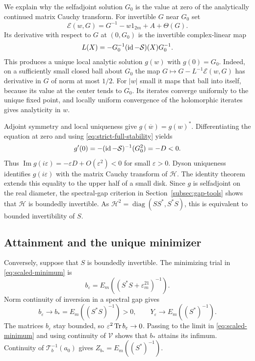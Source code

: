 We explain why the selfadjoint solution $G_0$ is the value at zero of the analytically continued matrix Cauchy transform.
For invertible $G$ near $G_0$ set
\[
 \mathcal E(w,G)=G^{-1}-w1_{2m}+A+\Theta(G).
\]
Its derivative with respect to $G$ at $(0,G_0)$ is the invertible complex-linear map
\[
 L(X)=-G_0^{-1}(\operatorname{id}-\mathcal S)(X)G_0^{-1}.
\]
This produces a unique local analytic solution $g(w)$ with $g(0)=G_0$.
Indeed, on a sufficiently small closed ball about $G_0$ the map $G\mapsto G-L^{-1}\mathcal E(w,G)$ has derivative in $G$ of norm at most $1/2$.
For $|w|$ small it maps that ball into itself, because its value at the center tends to $G_0$.
Its iterates converge uniformly to the unique fixed point, and locally uniform convergence of the holomorphic iterates gives analyticity in $w$.

Adjoint symmetry and local uniqueness give $g(\overline w)=g(w)^*$.
Differentiating the equation at zero and using \eqref{eq:strict-full-stability} yields
\begin{equation}\label{eq:gap-derivative}
 g'(0)=-(\operatorname{id}-\mathcal S)^{-1}(G_0^2)=-D<0.
\end{equation}
Thus $\operatorname{Im}g(i\varepsilon)=-\varepsilon D+O(\varepsilon^2)<0$ for small $\varepsilon>0$.
Dyson uniqueness identifies $g(i\varepsilon)$ with the matrix Cauchy transform of $\mathscr H$.
The identity theorem extends this equality to the upper half of a small disk.
Since $g$ is selfadjoint on the real diameter, the spectral-gap criterion in Section~\ref{subsec:gap-tools} shows that $\mathscr H$ is boundedly invertible.
As $\mathscr H^2=\operatorname{diag}(SS^*,S^*S)$, this is equivalent to bounded invertibility of $S$.

\subsection{Attainment and the unique minimizer}
Conversely, suppose that $S$ is boundedly invertible.
The minimizing trial in \eqref{eq:scaled-minimum} is
\[
 b_\varepsilon=E_m((S^*S+\varepsilon^21_m)^{-1}).
\]
Norm continuity of inversion in a spectral gap gives
\[
 b_\varepsilon\longrightarrow b_*=E_m((S^*S)^{-1})>0,
 \qquad Y_\varepsilon\longrightarrow E_m((S^*)^{-1}).
\]
The matrices $b_\varepsilon$ stay bounded, so $\varepsilon^2\operatorname{Tr} b_\varepsilon\to0$.
Passing to the limit in \eqref{eq:scaled-minimum} and using continuity of $\mathcal V$ shows that $b_*$ attains its infimum.
Continuity of $\mathcal T_b^{-1}(a_0)$ gives $Z_{b_*}=E_m((S^*)^{-1})$.

